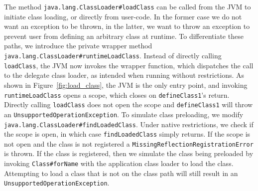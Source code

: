 The method \verb|java.lang.ClassLoader#loadClass| can be called from the JVM to initiate class loading, or directly from user-code. In the former case we do not want an exception to be thrown, in the latter, we want to throw an exception to prevent user from defining an arbitrary class at runtime.
To differentiate these paths, we introduce the private wrapper method \verb|java.lang.ClassLoader#runtimeLoadClass|. Instead of directly calling \verb|loadClass|, the JVM now invokes the wrapper function, which dispatches the call to the delegate class loader, as intended when running without restrictions. As shown in Figure~\ref{fig:load_class}, the JVM is the only entry point, and invoking \verb|runtimeLoadClass| opens a scope, which closes on \verb|defineClass1|'s return.
Directly calling \verb|loadClass| does not open the scope and \verb|defineClass1| will throw an \verb|UnsupportedOperationException|.
To simulate class preloading, we modify \verb|java.lang.ClassLoader#findLoadedClass|.
Under native restrictions, we check if the scope is open, in which case \verb|findLoadedClass| simply returns. If the scope is not open and the class is not registered a \verb|MissingReflectionRegistrationError| is thrown.
If the class is registered, then we simulate the class being preloaded by invoking \verb|Class#forName| with the application class loader to load the class. Attempting to load a class that is not on the class path will still result in an \verb|UnsupportedOperationException|.


